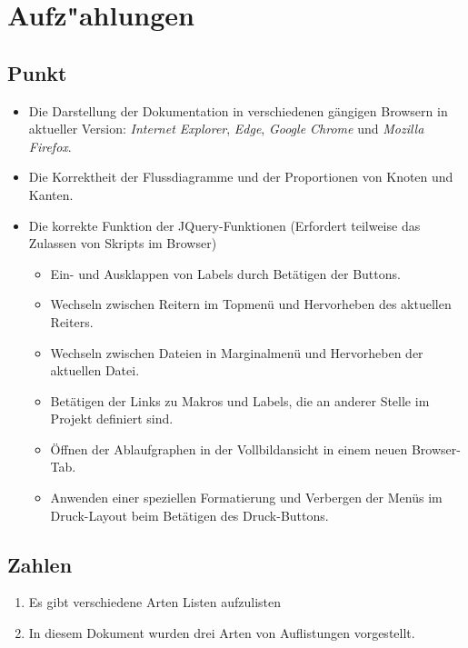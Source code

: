 \section{Aufz"ahlungen}
\label{sec:Aufzaehlungen}

\subsection{Punkt}
\label{subsec:Punkt}

\begin{itemize}
\item Die Darstellung der Dokumentation in verschiedenen gängigen Browsern in aktueller Version: \textit{Internet Explorer}, \textit{Edge}, \textit{Google Chrome} und \textit{Mozilla Firefox}.
\item Die Korrektheit der Flussdiagramme und der Proportionen von Knoten und Kanten.
\item Die korrekte Funktion der JQuery-Funktionen (Erfordert teilweise das Zulassen von Skripts im Browser)
\begin{itemize}
\item Ein- und Ausklappen von Labels durch Betätigen der Buttons.
\item Wechseln zwischen Reitern im Topmenü und Hervorheben des aktuellen Reiters.
\item Wechseln zwischen Dateien in Marginalmenü und Hervorheben der aktuellen Datei.
\item Betätigen der Links zu Makros und Labels, die an anderer Stelle im Projekt definiert sind.
\item Öffnen der Ablaufgraphen in der Vollbildansicht in einem neuen Browser-Tab.
\item Anwenden einer speziellen Formatierung und Verbergen der Menüs im Druck-Layout beim Betätigen des Druck-Buttons.
\end{itemize}
\end{itemize}

\subsection{Zahlen}
\label{subsec:Zahlen}

\begin{enumerate}
\item Es gibt verschiedene Arten Listen aufzulisten
\item In diesem Dokument wurden drei Arten von Auflistungen vorgestellt. 
\end{enumerate}


